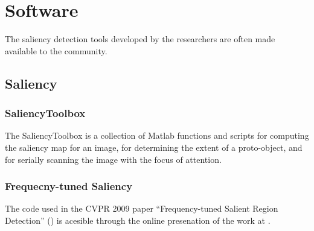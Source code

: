 \section{Software}
\label{sec:soft}

The saliency detection tools developed by the researchers are often made available to the community.

\subsection{Saliency}
\subsubsection{SaliencyToolbox}
The SaliencyToolbox is a collection of Matlab functions and scripts for computing the saliency map for an image, for determining the extent of a proto-object, and for serially scanning the image with the focus of attention. 

\subsubsection{Frequecny-tuned Saliency}
The code used in the CVPR 2009 paper ``Frequency-tuned Salient Region Detection'' (\cite{LCAV-CONF-2009-012}) is acesible through the online presenation of the work at \cite{achantaCVPR09}.
